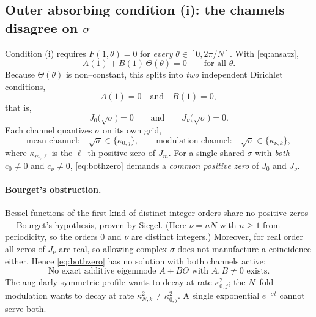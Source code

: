 \documentclass{article}
\begin{document}
\subsection{Outer absorbing condition (i): the channels disagree on $\sigma$}

Condition (i) requires $F(1,\theta)=0$ for \emph{every} $\theta\in[0,2\pi/N]$.
With \eqref{eq:ansatz},
\begin{equation}
A(1)+B(1)\,\Theta(\theta)=0\qquad\text{for all }\theta .
\end{equation}
Because $\Theta(\theta)$ is non--constant, this splits into \emph{two}
independent Dirichlet conditions,
\begin{equation}
A(1)=0\quad\text{and}\quad B(1)=0,
\end{equation}
that is,
\begin{equation}
J_0\!\bigl(\sqrt\sigma\bigr)=0
\qquad\text{and}\qquad
J_\nu\!\bigl(\sqrt\sigma\bigr)=0 .
\label{eq:bothzero}
\end{equation}
Each channel quantizes $\sigma$ on its own grid,
\begin{equation}
\text{mean channel:}\quad \sqrt\sigma\in\{\kappa_{0,j}\},
\qquad
\text{modulation channel:}\quad \sqrt\sigma\in\{\kappa_{\nu,k}\},
\end{equation}
where $\kappa_{m,\ell}$ is the $\ell$--th positive zero of $J_m$. For a single
shared $\sigma$ with \emph{both} $c_0\neq0$ and $c_\nu\neq0$, \eqref{eq:bothzero}
demands a \emph{common positive zero} of $J_0$ and $J_\nu$.

\paragraph{Bourget's obstruction.} Bessel functions of the first kind of distinct
integer orders share no positive zeros --- Bourget's hypothesis, proven by
Siegel. (Here $\nu=nN$ with $n\geq1$ from periodicity, so the orders $0$ and
$\nu$ are distinct integers.) Moreover, for real order all zeros of $J_\nu$ are
real, so allowing complex $\sigma$ does not manufacture a coincidence either.
Hence \eqref{eq:bothzero} has no solution with both channels active:
\begin{equation}
\boxed{\;\text{No exact additive eigenmode }A+B\Theta\text{ with }A,B\neq0
\text{ exists.}\;}
\end{equation}
The angularly symmetric profile wants to decay at rate $\kappa_{0,j}^2$; the
$N$--fold modulation wants to decay at rate $\kappa_{N,k}^2\neq\kappa_{0,j}^2$.
A single exponential $e^{-\sigma t}$ cannot serve both.
\end{document}
